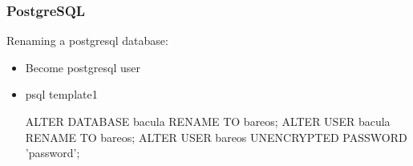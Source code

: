 \subsubsection{PostgreSQL}

Renaming a postgresql database:

\begin{itemize}
 \item Become postgresql user
 \item psql template1
\begin{commands}{}
ALTER DATABASE bacula RENAME TO bareos;
ALTER USER bacula RENAME TO bareos;
ALTER USER bareos UNENCRYPTED PASSWORD 'password';
\end{commands}
\end{itemize}
